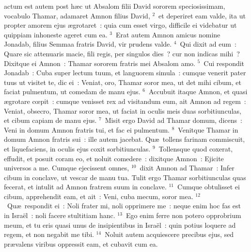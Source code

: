 \bchapter
{}actum est autem post h\ae c ut Absalom filii David sororem speciosissimam, vocabulo Thamar, adamaret Amnon filius David,
${}^{2}$~et deperiret eam valde, ita ut propter amorem ejus \ae grotaret~: quia cum esset virgo, difficile ei videbatur ut quippiam inhoneste ageret cum ea.
${}^{3}$~Erat autem Amnon amicus nomine Jonadab, filius Semmaa fratris David, vir prudens valde.
${}^{4}$~Qui dixit ad eum~: Quare sic attenuaris macie, fili regis, per singulos dies~? cur non indicas mihi~? Dixitque ei Amnon~: Thamar sororem fratris mei Absalom amo.
${}^{5}$~Cui respondit Jonadab~: Cuba super lectum tuum, et languorem simula~: cumque venerit pater tuus ut visitet te, dic ei~: Veniat, oro, Thamar soror mea, ut det mihi cibum, et faciat pulmentum, ut comedam de manu ejus.
${}^{6}$~Accubuit itaque Amnon, et quasi \ae grotare cœpit~: cumque venisset rex ad visitandum eum, ait Amnon ad regem~: Veniat, obsecro, Thamar soror mea, ut faciat in oculis meis duas sorbitiunculas, et cibum capiam de manu ejus.
${}^{7}$~Misit ergo David ad Thamar domum, dicens~: Veni in domum Amnon fratris tui, et fac ei pulmentum.
${}^{8}$~Venitque Thamar in domum Amnon fratris sui~: ille autem jacebat. Qu\ae\ tollens farinam commiscuit, et liquefaciens, in oculis ejus coxit sorbitiunculas.
${}^{9}$~Tollensque quod coxerat, effudit, et posuit coram eo, et noluit comedere~: dixitque Amnon~: Ejicite universos a me. Cumque ejecissent omnes,
${}^{10}$~dixit Amnon ad Thamar~: Infer cibum in conclave, ut vescar de manu tua. Tulit ergo Thamar sorbitiunculas quas fecerat, et intulit ad Amnon fratrem suum in conclave.
${}^{11}$~Cumque obtulisset ei cibum, apprehendit eam, et ait~: Veni, cuba mecum, soror mea.
${}^{12}$~Qu\ae\ respondit ei~: Noli frater mi, noli opprimere me~: neque enim hoc fas est in Isra\"el~: noli facere stultitiam hanc.
${}^{13}$~Ego enim ferre non potero opprobrium meum, et tu eris quasi unus de insipientibus in Isra\"el~: quin potius loquere ad regem, et non negabit me tibi.
${}^{14}$~Noluit autem acquiescere precibus ejus, sed pr\ae valens viribus oppressit eam, et cubavit cum ea.


